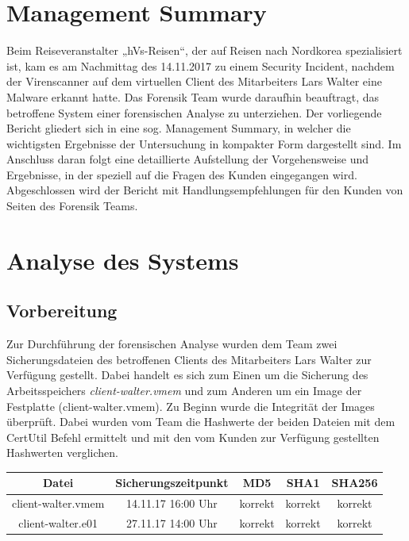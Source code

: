 \chapter{Management Summary}

Beim  Reiseveranstalter „hVs-Reisen“, der auf Reisen nach Nordkorea spezialisiert ist, kam es am Nachmittag des 14.11.2017 zu einem Security Incident, nachdem der
Virenscanner auf dem virtuellen Client des Mitarbeiters Lars Walter eine Malware
erkannt hatte.
Das Forensik Team wurde daraufhin beauftragt, das betroffene System einer forensischen Analyse zu unterziehen. Der vorliegende Bericht gliedert sich in eine sog. Management Summary, in welcher die wichtigsten Ergebnisse der Untersuchung in kompakter Form dargestellt sind. Im Anschluss daran folgt eine detaillierte Aufstellung der Vorgehensweise und Ergebnisse, in der speziell auf die Fragen des Kunden eingegangen wird. Abgeschlossen wird der Bericht mit Handlungsempfehlungen für den Kunden von Seiten des Forensik Teams.

\chapter{Analyse des Systems}

\section{Vorbereitung}
Zur Durchführung der forensischen Analyse wurden dem Team zwei Sicherungsdateien des betroffenen Clients des Mitarbeiters Lars Walter zur Verfügung gestellt. Dabei handelt es sich zum Einen um die Sicherung des Arbeitsspeichers \textit{client-walter.vmem} und zum Anderen um ein Image der Festplatte (client-walter.vmem). 
Zu Beginn wurde die Integrität der Images überprüft. Dabei wurden vom Team die Hashwerte der beiden Dateien mit dem CertUtil Befehl ermittelt und mit den vom Kunden zur Verfügung gestellten Hashwerten verglichen.


\begin{center}
	\begin{tabular}{|c|c|c|c|c|} 
		\hline
		Datei & Sicherungszeitpunkt & MD5 & SHA1 & SHA256 \\ [0.5ex] 
		\hline
		client-walter.vmem & 14.11.17 16:00 Uhr & korrekt & korrekt & korrekt \\ 
		\hline
		client-walter.e01 & 27.11.17 14:00 Uhr & korrekt & korrekt & korrekt \\ 
		\hline
	\end{tabular}
\end{center}

